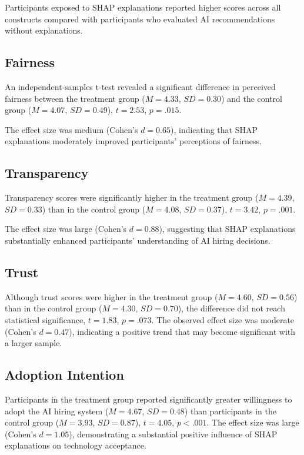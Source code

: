 \documentclass[conference]{IEEEtran}
\begin{document}
Participants exposed to SHAP explanations reported higher scores across all constructs compared with participants who evaluated AI recommendations without explanations.

\subsection{Fairness}

An independent-samples t-test revealed a significant difference in perceived fairness between the treatment group ($M = 4.33$, $SD = 0.30$) and the control group ($M = 4.07$, $SD = 0.49$), $t = 2.53$, $p = .015$.

The effect size was medium (Cohen's $d = 0.65$), indicating that SHAP explanations moderately improved participants' perceptions of fairness.

\subsection{Transparency}

Transparency scores were significantly higher in the treatment group ($M = 4.39$, $SD = 0.33$) than in the control group ($M = 4.08$, $SD = 0.37$), $t = 3.42$, $p = .001$.

The effect size was large (Cohen's $d = 0.88$), suggesting that SHAP explanations substantially enhanced participants' understanding of AI hiring decisions.

\subsection{Trust}

Although trust scores were higher in the treatment group ($M = 4.60$, $SD = 0.56$) than in the control group ($M = 4.30$, $SD = 0.70$), the difference did not reach statistical significance, $t = 1.83$, $p = .073$. The observed effect size was moderate (Cohen's $d = 0.47$), indicating a positive trend that may become significant with a larger sample.

\subsection{Adoption Intention}

Participants in the treatment group reported significantly greater willingness to adopt the AI hiring system ($M = 4.67$, $SD = 0.48$) than participants in the control group ($M = 3.93$, $SD = 0.87$), $t = 4.05$, $p < .001$. The effect size was large (Cohen's $d = 1.05$), demonstrating a substantial positive influence of SHAP explanations on technology acceptance.
\end{document}

